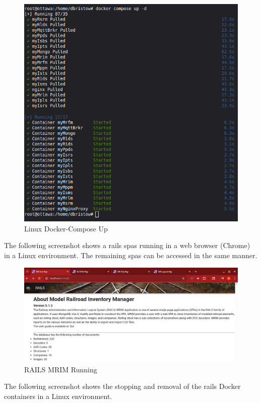 \begin{figure}[H]
    \centering
    \includegraphics[scale=0.5]{../Images/docker-compose-up-linux.png}
    \caption{Linux Docker-Compose Up}
    \label{fig:linux-docker-cmds-2}
\end{figure}
The following screenshot shows a \gls{rails} \glspl{spa} running in a web browser (Chrome) in a Linux environment. The remaining \glspl{spa} can be accessed in the same manner.
\begin{figure}[H]
    \centering
    \includegraphics[scale=0.36]{../Images/mrim-home.png}
    \caption{RAILS MRIM Running}
    \label{fig:rails-mrim}
\end{figure}
The following screenshot shows the stopping and removal of the \gls{rails} Docker containers in a Linux environment.

